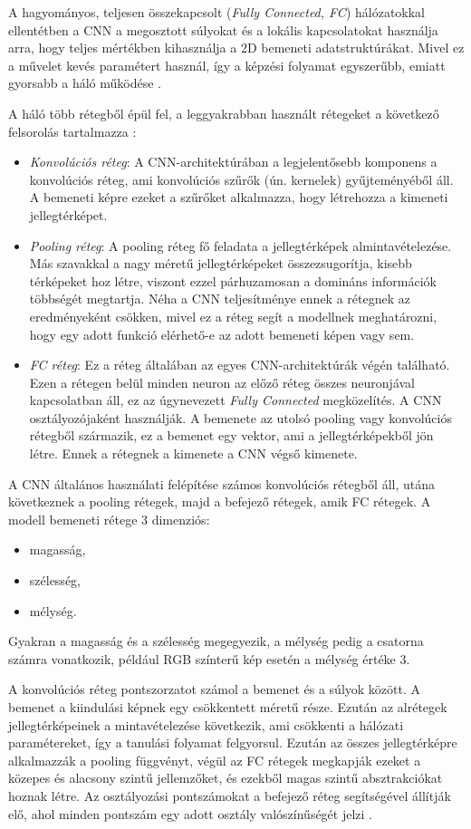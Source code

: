 A hagyományos, teljesen összekapcsolt (\textit{Fully Connected, FC}) hálózatokkal ellentétben a CNN a megosztott súlyokat és a lokális kapcsolatokat használja arra, hogy teljes mértékben kihasználja a 2D bemeneti adatstruktúrákat. Mivel ez a művelet kevés paramétert használ, így a képzési folyamat egyszerűbb, emiatt gyorsabb a háló működése \cite{cnn}.

A háló több rétegből épül fel, a leggyakrabban használt rétegeket a következő felsorolás tartalmazza \cite{cnn}:
\begin{itemize}
\item \textit{Konvolúciós réteg}: A CNN-architektúrában a legjelentősebb komponens a konvolúciós réteg, ami konvolúciós szűrők (ún. kernelek) gyűjteményéből áll. A bemeneti képre ezeket a szűrőket alkalmazza, hogy létrehozza a kimeneti jellegtérképet.
\item \textit{Pooling réteg}: A pooling réteg fő feladata a jellegtérképek almintavételezése. Más szavakkal a nagy méretű jellegtérképeket összezsugorítja, kisebb térképeket hoz létre, viszont ezzel párhuzamosan a domináns információk többségét megtartja. Néha a CNN teljesítménye ennek a rétegnek az eredményeként csökken, mivel ez a réteg segít a modellnek meghatározni, hogy egy adott funkció elérhető-e az adott bemeneti képen vagy sem.
\item \textit{FC réteg}: Ez a réteg általában az egyes CNN-architektúrák végén található. Ezen a rétegen belül minden neuron az előző réteg összes neuronjával kapcsolatban áll, ez az úgynevezett \textit{Fully Connected} megközelítés. A CNN osztályozójaként használják. A bemenete az utolsó pooling vagy konvolúciós rétegből származik, ez a bemenet egy vektor, ami a jellegtérképekből jön létre. Ennek a rétegnek a kimenete a CNN végső kimenete.
\end{itemize}

A CNN általános használati felépítése számos konvolúciós rétegből áll, utána következnek a pooling rétegek, majd a befejező rétegek, amik FC rétegek. A modell bemeneti rétege 3 dimenziós:
\begin{itemize}
\item magasság,
\item szélesség,
\item mélység.
\end{itemize}
Gyakran a magasság és a szélesség megegyezik, a mélység pedig a csatorna számra vonatkozik, például RGB színterű kép esetén a mélység értéke 3.

A konvolúciós réteg pontszorzatot számol a bemenet és a súlyok között. A bemenet a kiindulási képnek egy csökkentett méretű része. Ezután az alrétegek jellegtérképeinek a mintavételezése következik, ami csökkenti a hálózati paramétereket, így a tanulási folyamat felgyorsul. Ezután az összes jellegtérképre alkalmazzák a pooling függvényt, végül az FC rétegek megkapják ezeket a közepes és alacsony szintű jellemzőket, és ezekből magas szintű absztrakciókat hoznak létre. Az osztályozási pontszámokat a befejező réteg segítségével állítják elő, ahol minden pontszám egy adott osztály valószínűségét jelzi \cite{cnn}.

